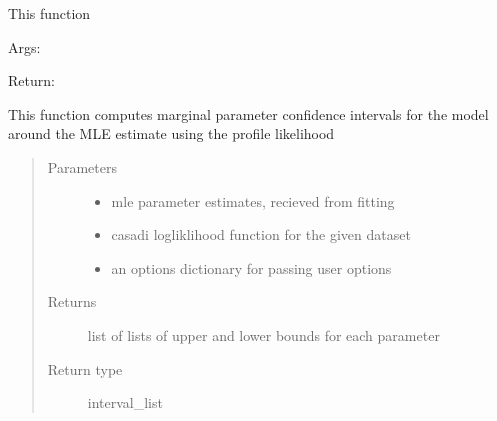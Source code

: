 \documentclass[letterpaper,10pt,english,openany,oneside]{sphinxmanual}
\begin{document}
\begin{fulllineitems}
\begin{fulllineitems}
\label{\detokenize{nloed:nloed.model.Model.evaluate}}
This function

Args:

Return:

\end{fulllineitems}


\begin{fulllineitems}
\label{\detokenize{nloed:nloed.model.Model.__confidence_intervals}}
This function computes marginal parameter confidence intervals for the model
around the MLE estimate using the profile likelihood
\begin{quote}\begin{description}
\item[{Parameters}] \leavevmode\begin{itemize}
\item {} 
 \textendash{} mle parameter estimates,  recieved from fitting

\item {} 
 \textendash{} casadi logliklihood function for the given dataset

\item {} 
 \textendash{} an options dictionary for passing user options

\end{itemize}

\item[{Returns}] \leavevmode
list of lists of upper and lower bounds for each parameter

\item[{Return type}] \leavevmode
interval\_list

\end{description}\end{quote}


\end{fulllineitems}
\end{fulllineitems}
\end{document}

